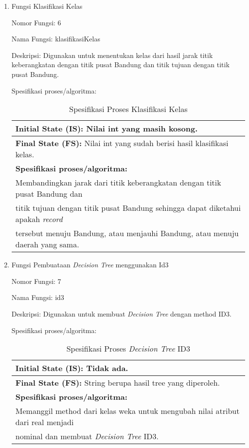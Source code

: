 \begin{enumerate}
	
	\item Fungsi Klasifikasi Kelas
	
	Nomor Fungsi: 6
	
	Nama Fungsi: klasifikasiKelas
	
	Deskripsi: Digunakan untuk menentukan kelas dari hasil jarak titik keberangkatan dengan titik pusat Bandung dan titik tujuan dengan titik pusat Bandung.
	
	Spesifikasi proses/algoritma:
	\begin{table}[h]
	\caption{Spesifikasi Proses Klasifikasi Kelas}
	\label{table:spesifikasiKlasifikasiKelas}
	\centering
	\begin{tabular}{|l|}
	\hline
	\textbf{Initial State (IS): }Nilai int yang masih kosong.		 																			\\ \hline
	\textbf{Final State (FS): }Nilai int yang sudah berisi hasil klasifikasi kelas.							\\ \hline
	\textbf{Spesifikasi proses/algoritma:}																 \\
	Membandingkan jarak dari titik keberangkatan dengan titik pusat Bandung dan \\
	titik tujuan dengan titik pusat Bandung sehingga dapat diketahui apakah \textsl{record} \\
	tersebut menuju Bandung, atau menjauhi Bandung, atau menuju daerah yang sama.\\ \hline
	\end{tabular}
	\end{table}
	
	
	\item Fungsi Pembuataan \textsl{Decision Tree} menggunakan Id3
	
	Nomor Fungsi: 7
	
	Nama Fungsi: id3
	
	Deskripsi: Digunakan untuk membuat \textsl{Decision Tree} dengan method ID3.
	
	Spesifikasi proses/algoritma:
	\begin{table}[h]
	\caption{Spesifikasi Proses \textsl{Decision Tree} ID3}
	\label{table:spesifikasiID3}
	\centering
	\begin{tabular}{|l|}
	\hline
	\textbf{Initial State (IS): }Tidak ada.		 																			\\ \hline
	\textbf{Final State (FS): }String berupa hasil tree yang diperoleh.							\\ \hline
	\textbf{Spesifikasi proses/algoritma:}																 \\
	Memanggil method dari kelas weka untuk mengubah nilai atribut dari real menjadi \\
	nominal dan membuat \textsl{Decision Tree} ID3. \\ \hline
	\end{tabular}
	\end{table}
	

\end{enumerate}
